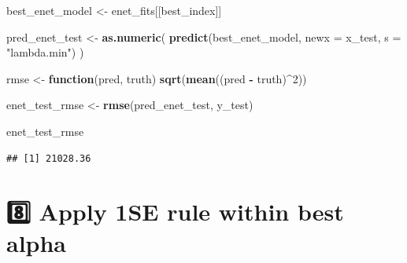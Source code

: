 \documentclass[
]{article}
\newenvironment{Shaded}{\begin{snugshade}}{\end{snugshade}}
\newcommand{\AttributeTok}[1]{\textcolor[rgb]{0.13,0.29,0.53}{#1}}
\newcommand{\ControlFlowTok}[1]{\textcolor[rgb]{0.13,0.29,0.53}{\textbf{#1}}}
\newcommand{\DecValTok}[1]{\textcolor[rgb]{0.00,0.00,0.81}{#1}}
\newcommand{\FloatTok}[1]{\textcolor[rgb]{0.00,0.00,0.81}{#1}}
\newcommand{\FunctionTok}[1]{\textcolor[rgb]{0.13,0.29,0.53}{\textbf{#1}}}
\newcommand{\NormalTok}[1]{#1}
\newcommand{\OtherTok}[1]{\textcolor[rgb]{0.56,0.35,0.01}{#1}}
\newcommand{\SpecialCharTok}[1]{\textcolor[rgb]{0.81,0.36,0.00}{\textbf{#1}}}
\newcommand{\StringTok}[1]{\textcolor[rgb]{0.31,0.60,0.02}{#1}}
\begin{document}
\begin{Shaded}
\begin{Highlighting}[]
\NormalTok{best\_enet\_model }\OtherTok{\textless{}{-}}\NormalTok{ enet\_fits[[best\_index]]}

\NormalTok{pred\_enet\_test }\OtherTok{\textless{}{-}} \FunctionTok{as.numeric}\NormalTok{(}
  \FunctionTok{predict}\NormalTok{(best\_enet\_model, }\AttributeTok{newx =}\NormalTok{ x\_test, }\AttributeTok{s =} \StringTok{"lambda.min"}\NormalTok{)}
\NormalTok{)}

\NormalTok{rmse }\OtherTok{\textless{}{-}} \ControlFlowTok{function}\NormalTok{(pred, truth) }\FunctionTok{sqrt}\NormalTok{(}\FunctionTok{mean}\NormalTok{((pred }\SpecialCharTok{{-}}\NormalTok{ truth)}\SpecialCharTok{\^{}}\DecValTok{2}\NormalTok{))}

\NormalTok{enet\_test\_rmse }\OtherTok{\textless{}{-}} \FunctionTok{rmse}\NormalTok{(pred\_enet\_test, y\_test)}

\NormalTok{enet\_test\_rmse}
\end{Highlighting}
\end{Shaded}

\begin{verbatim}
## [1] 21028.36
\end{verbatim}

\section{8️⃣ Apply 1SE rule within best
alpha}\label{apply-1se-rule-within-best-alpha}

\begin{Shaded}
\end{Shaded}
\end{document}
